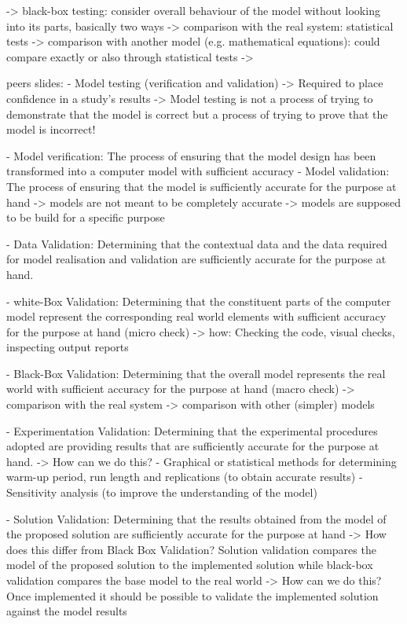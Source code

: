 	-> black-box testing: consider overall behaviour of the model without looking into its parts, basically two ways
		-> comparison with the real system: statistical tests
		-> comparison with another model (e.g. mathematical equations): could compare exactly or also through statistical tests
		-> 
		
peers slides:
	- Model testing (verification and validation)
		-> Required to place confidence in a study's results
		-> Model testing is not a process of trying to demonstrate that the model is correct but a process of trying to prove that the model is incorrect!
		
	- Model verification: The process of ensuring that the model design has been transformed into a computer model with sufficient accuracy
	- Model validation: The process of ensuring that the model is sufficiently accurate for the purpose at hand
		-> models are not meant to be completely accurate
		-> models are supposed to be build for a specific purpose
		
	- Data Validation: Determining that the contextual data and the data required for model realisation and validation are sufficiently accurate for the purpose at hand.

    - white-Box Validation: Determining that the constituent parts of the computer model represent the corresponding real world elements with sufficient accuracy for the purpose at hand (micro check)
    	-> how: Checking the code, visual checks, inspecting output reports
    	
    - Black-Box Validation: Determining that the overall model represents the real world with sufficient accuracy for the purpose at hand (macro check)
    	-> comparison with the real system
    	-> comparison with other (simpler) models
    	
    - Experimentation Validation: Determining that the experimental procedures adopted are providing results that are sufficiently accurate for the purpose at hand.
    	-> How can we do this?
    		- Graphical or statistical methods for determining warm-up period, run length and replications (to obtain accurate results)
			- Sensitivity analysis (to improve the understanding of the model)
	
	- Solution Validation: Determining that the results obtained from the model of the proposed solution are sufficiently accurate for the purpose at hand
		-> How does this differ from Black Box Validation? Solution validation compares the model of the proposed solution to the implemented solution while black-box validation compares the base model to the real world
		-> How can we do this? Once implemented it should be possible to validate the implemented solution against the model results
		
